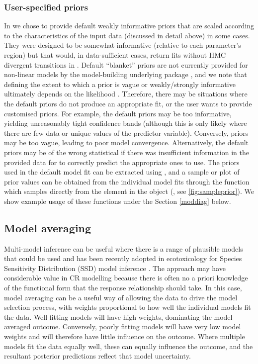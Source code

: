 \documentclass[
  shortnames]{jss}
\begin{document}
\subsubsection[User-specified priors]{User-specified priors}\label{usp}

In  we chose to provide default weakly informative priors that are scaled according to the characteristics of the input data (discussed in detail above) in some cases. They were designed to be somewhat informative (relative to each parameter's region) but that would, in data-sufficient cases, return fits without HMC divergent transitions in . Default ``blanket'' priors are not currently provided for non-linear models by the model-building underlying package , and we note that defining the extent to which a prior is vague or weakly/strongly informative ultimately depends on the likelihood \citep{gelman2017entropy}. Therefore, there may be situations where the default  priors do not produce an appropriate fit, or the user wants to provide customised priors. For example, the default priors may be too informative, yielding unreasonably tight confidence bands (although this is only likely where there are few data or unique values of the predictor variable). Conversely, priors may be too vague, leading to poor model convergence. Alternatively, the default priors may be of the wrong statistical  if there was insufficient information in the provided data for  to correctly predict the appropriate ones to use. The priors used in the default model fit can be extracted using , and a sample or plot of prior values can be obtained from the individual  model fits through the function  which samples directly from the  element in the  object (, see \autoref{fig:sampleprior}). We show example usage of these functions under the Section \ref{moddiag} below.

\subsection[Model averaging]{Model averaging}\label{modavg}

Multi-model inference can be useful where there is a range of plausible models that could be used \citep{Burnham2002} and has been recently adopted in ecotoxicology for Species Sensitivity Distribution (SSD) model inference \citep{Thorley2018, fox2020, Dalgarno}. The approach may have considerable value in CR modelling because there is often no a priori knowledge of the functional form that the response relationship should take. In this case, model averaging can be a useful way of allowing the data to drive the model selection process, with weights proportional to how well the individual models fit the data. Well-fitting models will have high weights, dominating the model averaged outcome. Conversely, poorly fitting models will have very low model weights and will therefore have little influence on the outcome. Where multiple models fit the data equally well, these can equally influence the outcome, and the resultant posterior predictions reflect that model uncertainty.
\end{document}
